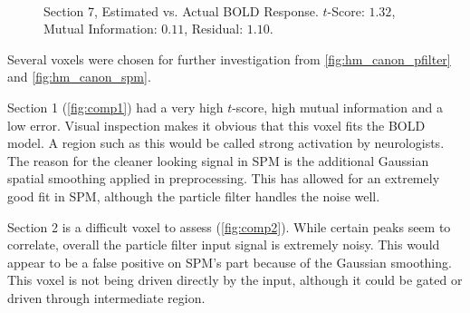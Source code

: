 \begin{figure}
\centering
{}\\
\caption{Section 7, Estimated vs. Actual \ac{BOLD} Response. $t$-Score: $1.32$, Mutual Information: $0.11$, Residual: $1.10$.}
\label{fig:comp7}
\end{figure}

Several voxels were chosen for further investigation from \autoref{fig:hm_canon_pfilter} and \autoref{fig:hm_canon_spm}.

Section 1 (\autoref{fig:comp1}) had a very high $t$-score, high mutual information and
a low error. Visual inspection makes it obvious that this voxel fits the \ac{BOLD} model. A region
such as this would be called strong activation by neurologists. The
reason for the cleaner looking signal in \ac{SPM} is the additional Gaussian spatial smoothing
applied in preprocessing. This
has allowed for an extremely good fit in \ac{SPM}, although the particle filter handles the noise
well.

Section 2 is a difficult voxel to assess (\autoref{fig:comp2}).
While certain peaks seem to correlate, overall
the particle filter input signal is extremely noisy.
This would appear to be a false positive on \ac{SPM}'s part because of the Gaussian smoothing.
This voxel is not being driven directly by the input, although it
could be gated or driven through intermediate region.

